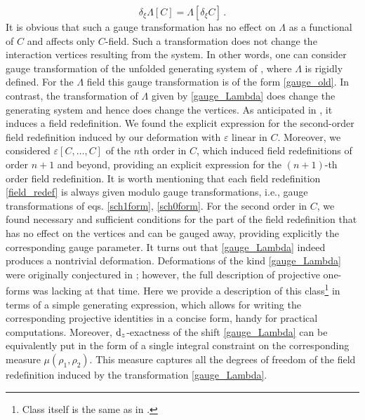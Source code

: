 \documentclass[12pt]{article}
\newcommand{\dr}{{{\rm d}}}
\begin{document}
\begin{equation}\label{gauge_old}
\delta_\xi\Lambda[C]=\Lambda[\delta_\xi C]\,.
\end{equation}
It is obvious that such a gauge transformation has no effect on 
$\Lambda$ as a functional of $C$ and affects only 
$C$-field. Such a transformation does not change the interaction vertices resulting from the system.  In other words, one can consider gauge transformation of the unfolded generating system of \cite{Didenko:2022qga}, where $\Lambda$ is rigidly defined. For the $\Lambda$ field this gauge transformation is of the form \eqref{gauge_old}.  In contrast, the transformation of $\Lambda$ given by \eqref{gauge_Lambda} does change the generating system and hence does change the vertices. As anticipated in \cite{Didenko:2026nag}, it induces a field redefinition. We found the explicit expression for the second-order field redefinition induced by our deformation with $\varepsilon$ linear in $C$. Moreover, we considered 
$\varepsilon[C,\ldots,C]$ of the 
$n$th order in 
$C$, which induced field redefinitions of order 
$n+1$ and beyond, providing an explicit expression for the 
$(n+1)$-th order field redefinition. It is worth mentioning that each field redefinition \eqref{field_redef} is always given modulo gauge transformations, i.e., gauge transformations of eqs. \eqref{sch1form}, \eqref{sch0form}. For the second order in $C$, we found necessary and sufficient conditions for the part of the field redefinition that has no effect on the vertices and can be gauged away, providing explicitly the corresponding gauge parameter. It turns out that \eqref{gauge_Lambda} indeed produces a nontrivial deformation. Deformations of the kind \eqref{gauge_Lambda} were originally conjectured in \cite{Korybut:2025vdn}; however, the full description of projective one-forms was lacking at that time. Here we provide a description of this class\footnote{Class itself is the same as in \cite{Didenko:2026nag}.} in terms of a simple generating expression, which allows for writing the corresponding projective identities in a concise form, handy for practical computations. Moreover, $\dr_z$-exactness of the shift \eqref{gauge_Lambda} can be equivalently put in the form of a single integral constraint on the corresponding measure $\mu(\rho_1,\rho_2)$. This measure captures all the degrees of freedom of the field redefinition induced by the transformation \eqref{gauge_Lambda}. 
\end{document}
